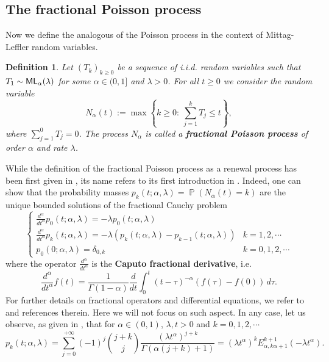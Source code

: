\documentclass[]{amsart}
\numberwithin{equation}{section}
\newtheorem{defn}{Definition}[section]
\theoremstyle{remark}
\theoremstyle{definition}
\DeclareMathOperator{\bP}{\mathbb{P}}
\newcommand{\der}[2]{\frac{d #1}{d #2}}
\newcommand{\dersup}[3]{\frac{d^{#3} #1}{d #2^{#3}}}
\begin{document}
\subsection{The fractional Poisson process}
Now we define the analogous of the Poisson process in the context of Mittag-Leffler random variables.
\begin{defn}
	Let $(T_k)_{k \ge 0}$ be a sequence of i.i.d. random variables such that $T_1 \sim {\sf ML}_\alpha(\lambda)$ for some $\alpha \in (0,1]$ and $\lambda>0$. For all $t \ge 0$ we consider the random variable
	\begin{equation*}
		N_\alpha(t):=\max\left\{k \ge 0: \  \sum_{j=1}^{k}T_j \le t\right\},
	\end{equation*}
	where $\sum_{j=1}^{0}T_j=0$. The process $N_\alpha$ is called a \textbf{fractional Poisson process} of order $\alpha$ and rate $\lambda$.
\end{defn}
While the definition of the fractional Poisson process as a renewal process has been first given in \cite{mainardi2004fractional}, its name refers to its first introduction in \cite{laskin2003fractional}. Indeed, one can show that the probability masses $p_k(t;\alpha,\lambda)=\bP(N_\alpha(t)=k)$ are the unique bounded solutions of the fractional Cauchy problem
\begin{equation*}
	\begin{cases}
		\displaystyle \dersup{}{t}{\alpha}p_0(t;\alpha,\lambda)=-\lambda p_0(t;\alpha,\lambda)\\[7pt]
		\displaystyle \dersup{}{t}{\alpha}p_k(t;\alpha,\lambda)=-\lambda (p_k(t;\alpha,\lambda)-p_{k-1}(t;\alpha,\lambda)) & k=1,2,\cdots \\[7pt]
		p_0(0;\alpha,\lambda)=\delta_{0,k} & k=0,1,2,\cdots 
	\end{cases}
\end{equation*}
where the operator $\dersup{}{t}{\alpha}$ is the \textbf{Caputo fractional derivative}, i.e.
\begin{equation*}
	\dersup{}{t}{\alpha}f(t)=\frac{1}{\Gamma(1-\alpha)}\der{}{t}\int_0^t (t-\tau)^{-\alpha}(f(\tau)-f(0))\, d\tau.
\end{equation*}
For further details on fractional operators and differential equations, we refer to \cite{ascione2023fractional,Samko,kilbas2006theory} and references therein. Here we will not focus on such aspect. In any case, let us observe, as given in \cite{laskin2003fractional}, that for $\alpha \in (0,1)$, $\lambda,t>0$ and $k=0,1,2,\cdots$
\begin{equation}\label{eq:pkfPP}
	p_k(t;\alpha,\lambda)=\sum_{j=0}^{+\infty}(-1)^j\binom{j+k}{j}\frac{(\lambda t^\alpha)^{j+k}}{\Gamma(\alpha(j+k)+1)}=(\lambda t^\alpha)^kE^{k+1}_{\alpha,k\alpha+1}(-\lambda t^\alpha).
\end{equation}
\end{document}
